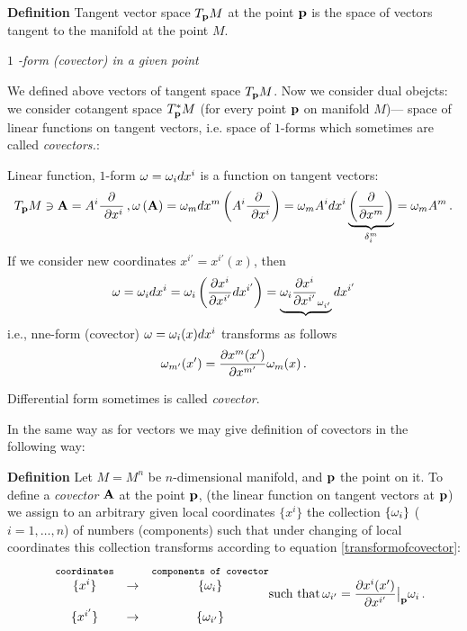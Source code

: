 \documentclass[12pt]{article}
\theoremstyle{theorem}
\numberwithin{equation}{section}
\begin{document}
\smallskip

{\bf Definition}  Tangent vector space $T_{\bf p} M$  at the point ${\bf p}$ is
the space of vectors tangent to the manifold at 
the point $M$.



{\it $1$ -form (covector) in a given point}

We defined above  vectors of tangent space $T_{\bf p} M$.
Now we consider dual obejcts: we consider cotangent space $T^*_{\bf p} M$
(for every point ${\bf p}$ on manifold $M$)---
    space of linear functions on tangent vectors, i.e. space 
of $1$-forms which sometimes are called
              {\it covectors.}:



 Linear function, $1$-form  $\omega=\omega_idx^i$ is a function on tangent vectors:
               $$
 T_{\bf p} M\ni{\bf A}=A^i{\partial \over \ \partial x^i}\,, \omega\left({\bf A}\right)
=\omega_mdx^m\left(A^i{\partial \over \ \partial x^i}\right)=\omega_mA^i dx^i
\underbrace{\left({\partial\over \partial x^m}\right)}_{\delta_i^m}=\omega_mA^m\,.
               $$ 
If we consider new coordinates $x^{i'}=x^{i'}(x)$, then
                  $$
\omega=\omega_idx^i=\omega_i\left({\partial x^i\over \partial x^{i'}}dx^{i'}\right)=
           \underbrace{\omega_i{\partial x^i\over \partial x^{i'}}_{\omega_{i'}}} dx^{i'}
                  $$
                   i.e., nne-form (covector) $\omega=\omega_i(x)dx^i$ 
transforms as follows
         \begin{equation}\label{transformofcovector}
            \omega_{m'}(x')={\partial x^{m}(x')\over \partial x^{m'}}\omega_m(x)\,.
         \end{equation}

Differential form sometimes is called {\it covector}.


In the same way as for vectors we may give definition
of covectors in the following way:

{\bf Definition}   Let $M=M^n$ be $n$-dimensional
manifold, and ${\bf p}$ the point on it.
To define a  {\it covector ${\bf A}$} at the point ${\bf p}$, 
(the linear function
on tangent vectors at ${\bf p}$)
we assign to an
arbitrary   
given local coordinates $\{x^i\}$
the collection $\{\omega_i\}$ ($i=1,\dots,n$)
of numbers (components) such that under 
changing of local coordinates
this collection transforms  according to equation
\eqref{transformofcovector}: 
         \begin{equation}\label{definitionofcovector}
  \begin{matrix}
&\hbox{{\tt {\footnotesize coordinates}}}
 &            
&\hbox{{\tt {\footnotesize components of covector}}}\cr
&\{x^i\}   &\rightarrow
     &   \{\omega_i\}\cr
 &&&\cr
&\{x^{i'}\}   &\rightarrow
     &   \{\omega_{i'}\}\cr
      \end{matrix}\hbox{such that}\, 
      \omega_{i'}=
{\partial x^{i}(x')\over \partial x^{i'}}\big\vert_{\bf p} \omega_i \,.  
        \end{equation}
\end{document}
